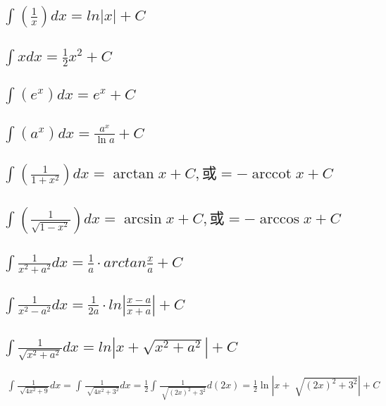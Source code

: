 \documentclass[UTF8]{ctexart}
\begin{document}
		
		
	\subsection{$\int (\frac{1} {x}) dx = ln |x| + C$}	
		
		
	\subsection{$\int x dx = \frac{1} {2} x^2 + C$}
		
	\subsection{$\int (e^x) dx = e^x + C$}		

	
	\subsection{$\int (a^x) dx = \frac{a^x} {\ln a} + C$}	
	
		
	\subsection{$ \int (\frac{1} {1+ x^2}) dx = \arctan x + C,  或= -\operatorname{arccot} x + C$}		
	
	\subsection{ $\int (\frac{1} {\sqrt{1-x^2}}) dx = \arcsin x + C,  或= -\arccos x + C$}
	
	\subsection{$ \int \frac{1} {x^2 + a^2} dx = \frac{1} {a} \cdot arctan \frac{x} {a} + C$}
	
	
	\subsection{$\int \frac{1} {x^2 - a^2} dx = \frac{1} {2a} \cdot ln |\frac{x-a} {x+a} | + C$}
		
	\subsection{$\int \frac{1} {\sqrt{x^2 + a^2}} dx = ln | x + \sqrt{x^2 + a^2}|+C$}
	
		\begin{myEnvSample}
			\begin{align*}
					\int_{}^{}{\frac{1}{\sqrt[]{4x^2+9}}dx=\int_{}^{}{\frac{1}{\sqrt[]{4x^2+3^2}}dx}=\frac{1}{2}}\int_{}^{}{\frac{1}{\sqrt[]{\left( 2x \right) ^2+3^2}}d\left( 2x \right) =\frac{1}{2}\ln \left| x+\sqrt[]{\left( 2x \right) ^2+3^2} \right|}+C		
			\end{align*}
		\end{myEnvSample}
	
\end{document}
